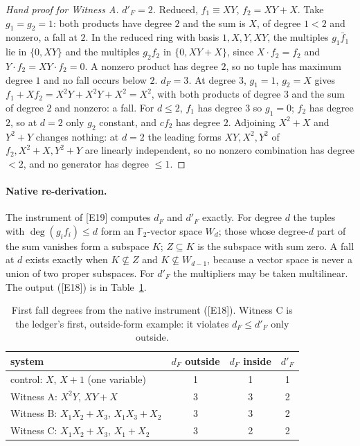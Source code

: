 \documentclass[10pt,a4paper]{article}
\newcommand{\FF}{\mathbb{F}}
\newcommand{\ev}[1]{\textup{[#1]}}
\theoremstyle{definition}
\theoremstyle{remark}
\begin{document}
\begin{proof}[Hand proof for Witness A]
\emph{$d'_F=2$.} Reduced, $f_1\equiv XY$, $f_2=XY+X$. Take $g_1=g_2=1$: both products
have degree $2$ and the sum is $X$, of degree $1<2$ and nonzero, a fall at $2$. In
the reduced ring with basis $1,X,Y,XY$, the multiples $g_1\bar f_1$ lie in $\{0,XY\}$
and the multiples $g_2f_2$ in $\{0,XY+X\}$, since $X\cdot f_2=f_2$ and
$Y\cdot f_2=XY\cdot f_2=0$. A nonzero product has degree $2$, so no tuple has maximum
degree $1$ and no fall occurs below $2$.
\emph{$d_F=3$.} At degree $3$, $g_1=1$, $g_2=X$ gives $f_1+Xf_2=X^2Y+X^2Y+X^2=X^2$,
with both products of degree $3$ and the sum of degree $2$ and nonzero: a fall. For
$d\le2$, $f_1$ has degree $3$ so $g_1=0$; $f_2$ has degree $2$, so at $d=2$ only
$g_2$ constant, and $cf_2$ has degree $2$. Adjoining $X^2+X$ and $Y^2+Y$ changes
nothing: at $d=2$ the leading forms $XY,X^2,Y^2$ of $f_2,X^2+X,Y^2+Y$ are linearly
independent, so no nonzero combination has degree $<2$, and no generator has degree
$\le1$. \qedhere
\end{proof}

\paragraph{Native re-derivation.}
The instrument of \ev{E19} computes $d_F$ and $d'_F$ exactly. For degree $d$ the
tuples with $\deg(g_if_i)\le d$ form an $\FF_2$-vector space $W_d$; those whose
degree-$d$ part of the sum vanishes form a subspace $K$; $Z\subseteq K$ is the
subspace with sum zero. A fall at $d$ exists exactly when $K\not\subseteq Z$ and
$K\not\subseteq W_{d-1}$, because a vector space is never a union of two proper
subspaces. For $d'_F$ the multipliers may be taken multilinear. The output
(\ev{E18}) is in Table~\ref{tab:l4}.

\begin{table}[t]
\centering\small
\begin{tabular}{@{}l c c c@{}}
\toprule
system & $d_F$ outside & $d_F$ inside & $d'_F$ \\
\midrule
control: $X$, $X+1$ (one variable)          & 1 & 1 & 1 \\
Witness A: $X^2Y$, $XY+X$                   & 3 & 3 & 2 \\
Witness B: $X_1X_2+X_3$, $X_1X_3+X_2$       & 3 & 3 & 2 \\
Witness C: $X_1X_2+X_3$, $X_1+X_2$          & 3 & 2 & 2 \\
\bottomrule
\end{tabular}
\caption{First fall degrees from the native instrument (\ev{E18}). Witness C is
the ledger's first, outside-form example: it violates $d_F\le d'_F$ only outside.}
\label{tab:l4}
\end{table}
\end{document}
